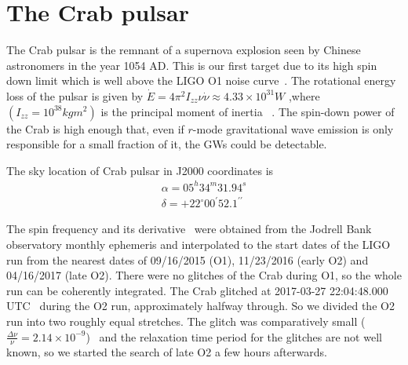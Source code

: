 \documentclass{ttuthes2007}
\begin{document}
	

\section{The Crab pulsar} \label{timing}
The Crab pulsar is the remnant of a supernova explosion seen by
Chinese astronomers in the year 1054 AD. This is our first target due to its
high spin down limit which is  well above the LIGO \ac{O1} noise
curve~\cite{Caride2019}. The rotational energy loss of the
pulsar is given by $\dot{E}=4\pi^2I_{zz}\nu\dot{\nu}\approx 4.33\times10^{31}W$
,where $(I_{zz}=10^{38}kg m^2)$ is the principal moment of inertia ~\cite{Abbott_2008}. The spin-down power of the Crab is high enough that, even if
$r$-mode gravitational wave emission is only responsible for a small fraction of
it, the \acp{GW} could be detectable.
 
The sky location of Crab pulsar in J2000 coordinates is~\cite{1993MNRAS.265.1003L} 
\begin{equation}
\begin{aligned} 
\alpha =05^h34^m31.94^s\\ 
\delta=
+22^\circ00^\prime52.1^{\prime\prime} 
\end{aligned} 
\end{equation}
 
The spin frequency and its derivative~\cite{1993MNRAS.265.1003L} were obtained
from the Jodrell Bank observatory monthly ephemeris and interpolated to the
start dates of the LIGO run from the nearest dates of 09/16/2015 (\ac{O1}),
11/23/2016 (early O2) and 04/16/2017 (late O2). There were no glitches of the
Crab during \ac{O1}, so the whole run can be coherently integrated. The Crab
glitched at 2017-03-27 22:04:48.000 UTC~\cite{Espinoza_2011} during the \ac{O2}
run, approximately halfway through. So we divided the \ac{O2} run into two
roughly equal stretches.  The glitch was comparatively small
($\frac{\Delta\nu}{\nu}= 2.14\times 10^{-9}$)~\cite{Espinoza_2011} and the
relaxation time period for the glitches are not well known, so we started the
search of late \ac{O2} a few hours afterwards.
\end{document}
